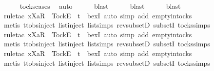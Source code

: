 \ \ \ \ \isamarkupfalse%
\ tocks{\isachardot}cases\ \isamarkupfalse%
\ auto\isanewline
\ \ \ \ \isamarkupfalse%
\ blast\isanewline
\ \ \ \ \isamarkupfalse%
\ blast\isanewline
\ \ \ \ \isamarkupfalse%
\ blast\isanewline
\ \ \ \ \isamarkupfalse%
\ {\isacharparenleft}rule{\isacharunderscore}tac\ x{\isacharequal}{\isachardoublequoteopen}{\isacharbrackleft}Xa{\isacharbrackright}\isactrlsub R\ {\isacharhash}\ {\isacharbrackleft}Tock{\isacharbrackright}\isactrlsub E\ {\isacharhash}\ t{\isachardoublequoteclose}\ \ bexI{\isacharcomma}\ auto\ simp\ add{\isacharcolon}\ empty{\isacharunderscore}in{\isacharunderscore}tocks{\isacharparenright}\isanewline
\ \ \ \ \ \ \ \ \ \ \ \isamarkupfalse%
\ {\isacharparenleft}metis\ ttobs{\isachardot}inject{\isacharparenleft}{}{\isacharparenright}\ list{\isachardot}inject\ list{\isachardot}simps{\isacharparenleft}{}{\isacharparenright}\ rev{\isacharunderscore}subsetD\ subsetI\ tocks{\isachardot}simps{\isacharparenright}\isanewline
\ \ \ \ \isamarkupfalse%
\ {\isacharparenleft}rule{\isacharunderscore}tac\ x{\isacharequal}{\isachardoublequoteopen}{\isacharbrackleft}Xa{\isacharbrackright}\isactrlsub R\ {\isacharhash}\ {\isacharbrackleft}Tock{\isacharbrackright}\isactrlsub E\ {\isacharhash}\ t{\isachardoublequoteclose}\ \ bexI{\isacharcomma}\ auto\ simp\ add{\isacharcolon}\ empty{\isacharunderscore}in{\isacharunderscore}tocks{\isacharparenright}\isanewline
\ \ \ \ \isamarkupfalse%
\ {\isacharparenleft}metis\ ttobs{\isachardot}inject{\isacharparenleft}{}{\isacharparenright}\ list{\isachardot}inject\ list{\isachardot}simps{\isacharparenleft}{}{\isacharparenright}\ rev{\isacharunderscore}subsetD\ subsetI\ tocks{\isachardot}simps{\isacharparenright}\isanewline
\ \ \ \ \isamarkupfalse%
\ {\isacharparenleft}rule{\isacharunderscore}tac\ x{\isacharequal}{\isachardoublequoteopen}{\isacharbrackleft}Xa{\isacharbrackright}\isactrlsub R\ {\isacharhash}\ {\isacharbrackleft}Tock{\isacharbrackright}\isactrlsub E\ {\isacharhash}\ t{\isachardoublequoteclose}\ \ bexI{\isacharcomma}\ auto\ simp\ add{\isacharcolon}\ empty{\isacharunderscore}in{\isacharunderscore}tocks{\isacharparenright}\isanewline
\ \ \ \ \isamarkupfalse%
\ {\isacharparenleft}metis\ ttobs{\isachardot}inject{\isacharparenleft}{}{\isacharparenright}\ list{\isachardot}inject\ list{\isachardot}simps{\isacharparenleft}{}{\isacharparenright}\ rev{\isacharunderscore}subsetD\ subsetI\ tocks{\isachardot}simps{\isacharparenright}\isanewline
